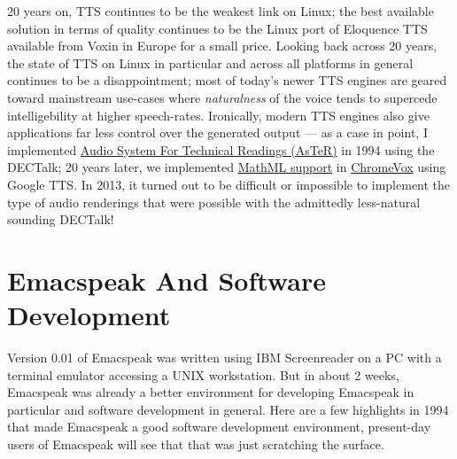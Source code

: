 \documentclass[11pt]{article}
\begin{document}
20 years on, TTS continues to be the weakest link on Linux; the
best available solution in terms of quality continues to be the
Linux port of Eloquence TTS available from Voxin in Europe for a
small price. Looking back across 20 years, the state of TTS on
Linux in particular and across all platforms in general continues
to be a disappointment; most of today's newer TTS engines are
geared toward mainstream use-cases where \emph{naturalness} of the
voice tends to supercede intelligebility at higher
speech-rates. Ironically, modern TTS engines also give
applications far less control over the generated output   —   as a
case in point, I implemented \href{http://www.cs.cornell.edu/home/raman/aster/demo.html}{Audio System For Technical Readings
(AsTeR)} in 1994 using the DECTalk; 20 years later, we implemented
\href{http://allthingsd.com/20130604/t-v-ramans-audio-deja-vu-from-google-a-math-reading-system-for-the-web/}{MathML support} in \href{http://www.chromevox.com/}{ChromeVox}  using Google TTS. In 2013, it turned
out to be difficult or impossible to implement the type of audio
renderings that were possible with the admittedly less-natural
sounding DECTalk!

\section{Emacspeak And Software Development}
\label{sec-5}



Version 0.01 of Emacspeak was written using IBM Screenreader on
a PC with a terminal emulator accessing a UNIX  workstation. But
in about 2 weeks, Emacspeak was already a better  environment for
developing Emacspeak in particular and software development in
general.  Here are a few highlights  in 1994 that made Emacspeak
a good software development environment, present-day users of
Emacspeak will see that that was just scratching the surface.
\end{document}
